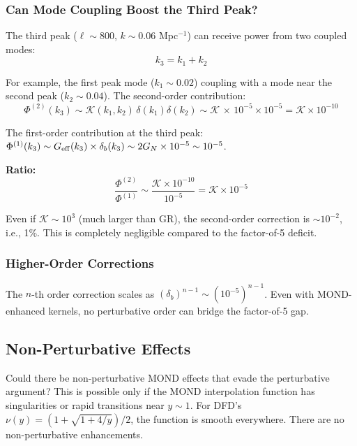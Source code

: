 \documentclass[11pt,a4paper]{article}
\begin{document}
\subsubsection{Can Mode Coupling Boost the Third Peak?}

The third peak ($\ell \sim 800$, $k \sim 0.06$ Mpc$^{-1}$) can receive power from two coupled modes:
\begin{equation}
k_3 = k_1 + k_2
\end{equation}

For example, the first peak mode ($k_1 \sim 0.02$) coupling with a mode near the second peak ($k_2 \sim 0.04$). The second-order contribution:
\begin{equation}
\Phi^{(2)}(k_3) \sim \mathcal{K}(k_1, k_2)\,\delta(k_1)\delta(k_2) \sim \mathcal{K}\,\times\,10^{-5}\times10^{-5} = \mathcal{K}\times10^{-10}
\end{equation}

The first-order contribution at the third peak: $\Phi^{(1)}(k_3) \sim G_{\rm eff}(k_3)\times\delta_b(k_3) \sim 2G_N \times 10^{-5} \sim 10^{-5}$.

\textbf{Ratio:}
\begin{equation}
\frac{\Phi^{(2)}}{\Phi^{(1)}} \sim \frac{\mathcal{K}\times10^{-10}}{10^{-5}} = \mathcal{K}\times10^{-5}
\end{equation}

Even if $\mathcal{K} \sim 10^3$ (much larger than GR), the second-order correction is $\sim 10^{-2}$, i.e., 1\%. This is completely negligible compared to the factor-of-5 deficit.

\subsubsection{Higher-Order Corrections}

The $n$-th order correction scales as $(\delta_b)^{n-1} \sim (10^{-5})^{n-1}$. Even with MOND-enhanced kernels, no perturbative order can bridge the factor-of-5 gap.

\subsection{Non-Perturbative Effects}

Could there be non-perturbative MOND effects that evade the perturbative argument? This is possible only if the MOND interpolation function has singularities or rapid transitions near $y \sim 1$. For DFD's $\nu(y) = (1+\sqrt{1+4/y})/2$, the function is smooth everywhere. There are no non-perturbative enhancements.
\end{document}

